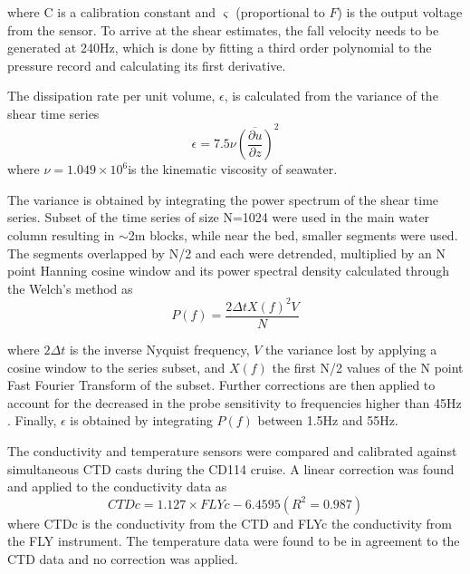 where C is a calibration constant and $\varsigma$ (proportional to
$F$) is the output voltage from the sensor. To arrive at the shear
estimates, the fall velocity needs to be generated at 240Hz, which
is done by fitting a third order polynomial to the pressure record
and calculating its first derivative.

The dissipation rate per unit volume, $\epsilon$, is calculated
from the variance of the shear time series
\begin{equation}
\epsilon = 7.5 \nu \overline{\left( \frac{\partial u}{\partial
z}\right) }^2
\end{equation}
where $\nu = 1.049\times 10^6$\mix is the kinematic viscosity of
seawater.

The variance is obtained by integrating the power spectrum of the
shear time series. Subset of the time series of size N=1024 were
used in the main water column resulting in $\sim$2m blocks, while
near the bed, smaller segments were used. The segments overlapped
by N/2 and each were detrended, multiplied by an N point Hanning
cosine window and its power spectral density calculated through
the Welch's method as
\begin{equation}
P(f)=\frac{2\Delta t X(f)^2 V}{N}
\end{equation}

where $2\Delta t$ is the inverse Nyquist frequency, $V$ the
variance lost by applying a cosine window to the series subset,
and $X(f)$ the first N/2 values of the N point Fast Fourier
Transform of the subset. Further corrections are then applied to
account for the decreased in the probe sensitivity to frequencies
higher than 45Hz \citep{Inall98}. Finally, $\epsilon$ is obtained
by integrating $P(f)$ between 1.5Hz and 55Hz.

The conductivity and temperature sensors were compared and
calibrated against simultaneous CTD casts during the CD114 cruise.
A linear correction was found and applied to the conductivity data
as
\begin{equation}
CTDc=1.127\times FLYc -6.4595 (R^2=0.987)
\end{equation}
where CTDc is the conductivity from the CTD and FLYc the
conductivity from the FLY instrument. The temperature data were
found to be in agreement to the CTD data and no correction was
applied.
